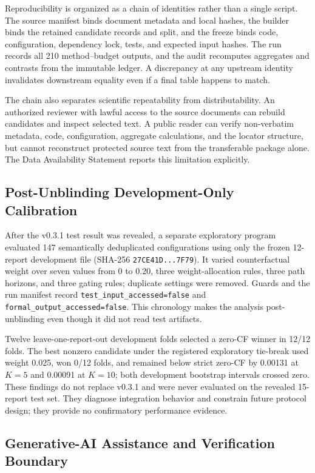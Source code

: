 \documentclass[applsci,article,submit,moreauthors]{Definitions/mdpi}
\begin{document}
Reproducibility is organized as a chain of identities rather than a single script. The source manifest binds document metadata and local hashes, the builder binds the retained candidate records and split, and the freeze binds code, configuration, dependency lock, tests, and expected input hashes. The run records all 210 method--budget outputs, and the audit recomputes aggregates and contrasts from the immutable ledger. A discrepancy at any upstream identity invalidates downstream equality even if a final table happens to match.

The chain also separates scientific repeatability from distributability. An authorized reviewer with lawful access to the source documents can rebuild candidates and inspect selected text. A public reader can verify non-verbatim metadata, code, configuration, aggregate calculations, and the locator structure, but cannot reconstruct protected source text from the transferable package alone. The Data Availability Statement reports this limitation explicitly.

\subsection{Post-Unblinding Development-Only Calibration}

After the v0.3.1 test result was revealed, a separate exploratory program evaluated 147 semantically deduplicated configurations using only the frozen 12-report development file (SHA-256 \texttt{27CE41D...7F79}). It varied counterfactual weight over seven values from 0 to 0.20, three weight-allocation rules, three path horizons, and three gating rules; duplicate settings were removed. Guards and the run manifest record \texttt{test\_input\_accessed=false} and \texttt{formal\_output\_accessed=false}. This chronology makes the analysis post-unblinding even though it did not read test artifacts.

Twelve leave-one-report-out development folds selected a zero-CF winner in 12/12 folds. The best nonzero candidate under the registered exploratory tie-break used weight 0.025, won 0/12 folds, and remained below strict zero-CF by 0.00131 at $K=5$ and 0.00091 at $K=10$; both development bootstrap intervals crossed zero. These findings do not replace v0.3.1 and were never evaluated on the revealed 15-report test set. They diagnose integration behavior and constrain future protocol design; they provide no confirmatory performance evidence.

\subsection{Generative-AI Assistance and Verification Boundary}
\end{document}
